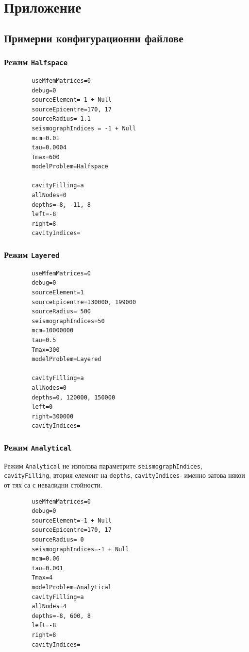 \documentclass{report}
\begin{document}
	\section{Приложение}
	\subsection{Примерни конфигурационни файлове}\label{app:configs}
	
	\subsubsection{Режим \texttt{Halfspace}}
	\begin{verbatim}
		useMfemMatrices=0
		debug=0
		sourceElement=-1 + Null
		sourceEpicentre=170, 17
		sourceRadius= 1.1
		seismographIndices = -1 + Null
		mcm=0.01
		tau=0.0004
		Tmax=600
		modelProblem=Halfspace
		
		cavityFilling=a
		allNodes=0
		depths=-8, -11, 8
		left=-8
		right=8
		cavityIndices=
	\end{verbatim}
	
	\subsubsection{Режим \texttt{Layered}}	
	
	\begin{verbatim}
		useMfemMatrices=0
		debug=0
		sourceElement=1
		sourceEpicentre=130000, 199000
		sourceRadius= 500
		seismographIndices=50
		mcm=10000000
		tau=0.5
		Tmax=300
		modelProblem=Layered
		
		cavityFilling=a
		allNodes=0
		depths=0, 120000, 150000
		left=0
		right=300000
		cavityIndices=
	\end{verbatim}
	\subsubsection{Режим \texttt{Analytical}}	
	Режим \texttt{Analytical} не използва параметрите \texttt{seismographIndices}, \texttt{cavityFilling}, втория елемент на \texttt{depths}, \texttt{cavityIndices}- именно затова някои от тях са с невалидни стойности.
	\begin{verbatim}
		useMfemMatrices=0
		debug=0
		sourceElement=-1 + Null
		sourceEpicentre=170, 17
		sourceRadius= 0
		seismographIndices=-1 + Null
		mcm=0.06
		tau=0.001
		Tmax=4
		modelProblem=Analytical
		cavityFilling=a
		allNodes=4
		depths=-8, 600, 8
		left=-8
		right=8
		cavityIndices=
	\end{verbatim}
	
\end{document}
